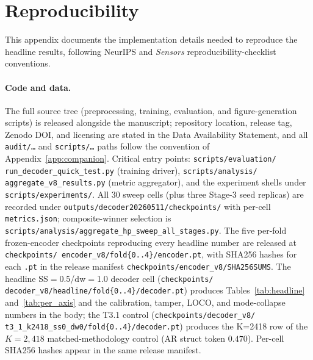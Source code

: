 \documentclass[sensors,article,submit,moreauthors,pdftex]{Definitions/mdpi}
\begin{document}

\section{Reproducibility}
\label{app3:repro}

This appendix documents the implementation details needed to reproduce the headline
results, following NeurIPS and \emph{Sensors} reproducibility-checklist conventions.

\paragraph{Code and data.}
\label{app3:repro-code}
The full source tree (preprocessing, training, evaluation, and figure-generation scripts) is released
alongside the manuscript; repository location, release tag, Zenodo DOI, and licensing are stated in the Data
Availability Statement, and all \texttt{audit/\ldots} and \texttt{scripts/\ldots} paths follow the convention
of Appendix~\ref{app:companion}. Critical entry points: \texttt{scripts/\allowbreak evaluation/\allowbreak
run\_decoder\_quick\_test.py} (training driver), \texttt{scripts/\allowbreak analysis/\allowbreak
aggregate\_v8\_results.py} (metric aggregator), and the experiment shells under \texttt{scripts/experiments/}.
All 30 sweep cells (plus three Stage-3 seed replicas) are recorded under \texttt{outputs/\allowbreak decoder20260511/\allowbreak checkpoints/} with per-cell \texttt{metrics.json}; composite-winner selection is \texttt{scripts/\allowbreak analysis/\allowbreak aggregate\_hp\_sweep\_all\_stages.py}. The five per-fold frozen-encoder checkpoints
reproducing every headline number are released at \texttt{checkpoints/\allowbreak
encoder\_v8/\allowbreak fold\{0..4\}/\allowbreak encoder.pt}, with SHA256 hashes for each \texttt{.pt} in the
release manifest \texttt{checkpoints/\allowbreak encoder\_v8/SHA256SUMS}. The headline SS$=$0.5/dw$=$1.0 decoder cell (\texttt{checkpoints/\allowbreak
decoder\_v8/\allowbreak headline/\allowbreak fold\{0..4\}/\allowbreak decoder.pt}) produces
Tables~\ref{tab:headline} and~\ref{tab:per_axis} and the calibration, tamper, LOCO, and mode-collapse numbers
in the body; the T3.1 control (\texttt{checkpoints/\allowbreak decoder\_v8/\allowbreak
t3\_1\_k2418\_ss0\_dw0/\allowbreak fold\{0..4\}/\allowbreak decoder.pt}) produces the K=2418 row of
the $K\!=\!2{,}418$ matched-methodology control (AR struct token $0.470$). Per-cell SHA256 hashes appear in the same release
manifest.
\end{document}

